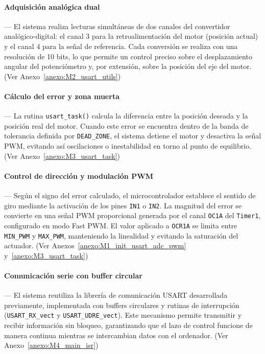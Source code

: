 \vspace{1em}

\paragraph*{\textbf{Adquisición analógica dual}}---
El sistema realiza lecturas simultáneas de dos canales del convertidor analógico-digital: el canal 3 para la retroalimentación del motor (posición actual) y el canal 4 para la señal de referencia. Cada conversión se realiza con una resolución de 10 bits, lo que permite un control preciso sobre el desplazamiento angular del potenciómetro y, por extensión, sobre la posición del eje del motor. (Ver Anexo~\ref{anexo:M2_usart_utils})

\vspace{1em}

\paragraph*{\textbf{Cálculo del error y zona muerta}}---
La rutina \texttt{usart\_task()} calcula la diferencia entre la posición deseada y la posición real del motor. Cuando este error se encuentra dentro de la banda de tolerancia definida por \texttt{DEAD\_ZONE}, el sistema detiene el motor y desactiva la señal PWM, evitando así oscilaciones o inestabilidad en torno al punto de equilibrio. (Ver Anexo~\ref{anexo:M3_usart_task})

\vspace{1em}

\paragraph*{\textbf{Control de dirección y modulación PWM}}---
Según el signo del error calculado, el microcontrolador establece el sentido de giro mediante la activación de los pines \texttt{IN1} o \texttt{IN2}. La magnitud del error se convierte en una señal PWM proporcional generada por el canal \texttt{OC1A} del \texttt{Timer1}, configurado en modo Fast PWM. El valor aplicado a \texttt{OCR1A} se limita entre \texttt{MIN\_PWM} y \texttt{MAX\_PWM}, manteniendo la linealidad y evitando la saturación del actuador. (Ver Anexos~\ref{anexo:M1_init_usart_adc_pwm} y~\ref{anexo:M3_usart_task})

\vspace{1em}

\paragraph*{\textbf{Comunicación serie con buffer circular}}---
El sistema reutiliza la librería de comunicación USART desarrollada previamente, implementada con buffers circulares y rutinas de interrupción (\texttt{USART\_RX\_vect} y \texttt{USART\_UDRE\_vect}). Este mecanismo permite transmitir y recibir información sin bloqueo, garantizando que el lazo de control funcione de manera continua mientras se intercambian datos con el ordenador. (Ver Anexo~\ref{anexo:M4_main_isr})


